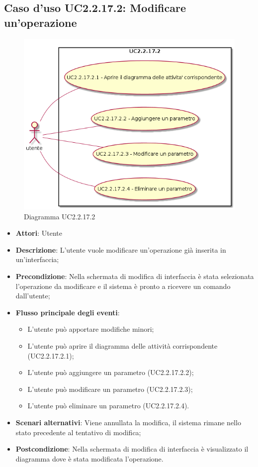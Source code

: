 \documentclass[../AnalisiDeiRequisiti.tex]{subfiles}
\begin{document}
				\subsection{Caso d'uso UC2.2.17.2: Modificare un'operazione}
				\begin{figure} [H]
					\centering
					\includegraphics[scale=0.45]{./Figures/UC2-2-17-2.png}
					\caption{Diagramma UC2.2.17.2}\label{}
				\end{figure}
				\begin{itemize}
					\item \textbf{Attori}: Utente
					\item \textbf{Descrizione}: L'utente vuole modificare un'operazione già inserita in un'interfaccia;
					\item \textbf{Precondizione}: Nella schermata di modifica di interfaccia è stata selezionata l'operazione da modificare e il sistema è pronto a ricevere un comando dall'utente;
					\item \textbf{Flusso principale degli eventi}: \begin{itemize}
						\item L'utente può apportare modifiche minori;
						\item L'utente può aprire il diagramma delle attività corrispondente (UC2.2.17.2.1);
						\item L'utente può aggiungere un parametro (UC2.2.17.2.2);
						\item L'utente può modificare un parametro (UC2.2.17.2.3);
						\item L'utente può eliminare un parametro (UC2.2.17.2.4).
					\end{itemize}
					\item \textbf{Scenari alternativi}: Viene annullata la modifica, il sistema rimane nello stato precedente al tentativo di modifica;
					\item \textbf{Postcondizione}: Nella schermata di modifica di interfaccia è visualizzato il diagramma dove è stata modificata l'operazione.
				\end{itemize}
\end{document}
